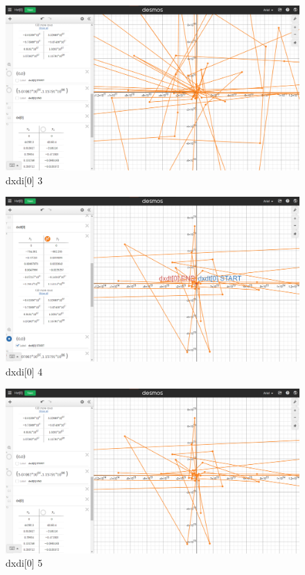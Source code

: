\begin{figure}[H]
    \includegraphics[width=\columnwidth]{figs/dxdi[0]_3}
    \caption{dxdi[0] 3}
\end{figure}
\begin{figure}[H]
    \includegraphics[width=\columnwidth]{figs/dxdi[0]_4}
    \caption{dxdi[0] 4}
\end{figure}
\begin{figure}[H]
    \includegraphics[width=\columnwidth]{figs/dxdi[0]_5}
    \caption{dxdi[0] 5}
\end{figure}
